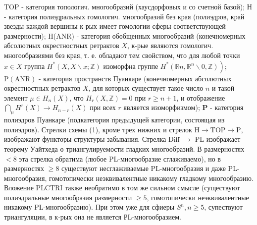 \documentclass[10pt]{article}
\begin{document}
TOP - категория топологич. многообразий (хаусдорфовых и со счетной базой); Н - категория полиэдральных гомологич. многообразий без края (полиэдров, край звезды каждой вершины к-рых имеет гомологии сферы соответствующей размерности); H(ANR) - категория обобщенных многообразий (конечномерных абсолютных окрестностных ретрактов $X$, к-рые являются гомологич. многообразиями без края, т. е. обладают тем свойством, что для любой точки $x \in X$ группа $H^{*}(X, X \backslash x ; \mathbb{Z})$ изоморфна группе $\left.H^{*}\left(\mathbb{R} n, \mathbb{R}{ }^{n} \backslash 0, \mathbb{Z}\right)\right)$; $\mathrm{P}(\mathrm{ANR})$ - категория пространств Пуанкаре (конечномерных абсолютных окрестностных ретрактов $X$, для которых существует такое число $n$ и такой элемент $\mu \in H_{n}(X)$, что $H_{r}(X, \mathbb{Z})=0$ при $r \geqslant n+1$, и отображение $\bigcap_{\mu} H^{r}(X) \rightarrow H_{n-r}(X)$ при всех $r$ является изоморфизмом); $\boldsymbol{P}$ - категория полиэдров Пуанкаре (подкатегория предыдущей категории, состоящая из полиэдров). Стрелки схемы (1), кроме трех нижних и стрелок $\mathrm{H} \rightarrow \mathrm{TOP} \rightarrow \mathrm{P}$, изображают функторы структуры забывания. Стрелка Diff $\rightarrow$ PL изображает теорему Уайтхеда о триангулируемости гладких многообразий. В размерностях $<8$ эта стрелка обратима (любое PL-многообразие сглаживаемо), но в размерностях $\geqslant 8$ существуют несглаживаемые PL-многообразия и даже PL-многообразия, гомотопически неэквивалентные никакому гладкому многообразию. Вложение PLCTRI также необратимо в том же сильном смысле (существуют полиэдральные многообразия размерности $\geqslant 5$, гомотопически неэквивалентные никакому PL-многообразию). При этом уже для сфиеры $S^{n}, n \geqslant 5$, супествуют триангуляции, в к-рых она не является РL-многообразием.
\end{document}
